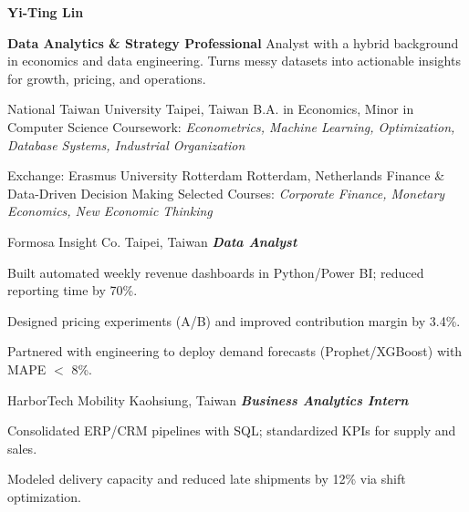 \documentclass[10pt]{article}
\begin{document}
\begin{center}
	\textbf{\LARGE Yi-Ting Lin}\\[0.5ex]
\end{center}
\spacedhrule{-1.0ex}{-0.5ex}
\spacedhrule{0.8ex}{0.0ex}

\begin{justify}
\textbf{Data Analytics \& Strategy Professional}
\small{Analyst with a hybrid background in economics and data engineering. Turns messy datasets into actionable insights for growth, pricing, and operations.}
\end{justify}

\spacedhrule{0.8ex}{0.0ex}

\headedsection
{National Taiwan University}
{Taipei, Taiwan}
{B.A. in Economics, Minor in Computer Science}
{}
{Coursework: \textit{Econometrics, Machine Learning, Optimization, Database Systems, Industrial Organization}}

\headedsection
{Exchange: Erasmus University Rotterdam}
{Rotterdam, Netherlands}
{Finance \& Data-Driven Decision Making}
{}
{Selected Courses: \textit{Corporate Finance, Monetary Economics, New Economic Thinking}}

\spacedhrule{0.8ex}{0.0ex}

\headedsection
{Formosa Insight Co.}
{Taipei, Taiwan}
{\textbf{\textsl{Data Analyst}}}
{}
{\vspace{-2.0ex}
\begin{circlist}
  \item Built automated weekly revenue dashboards in Python/Power BI; reduced reporting time by 70\%.
  \item Designed pricing experiments (A/B) and improved contribution margin by 3.4\%.
  \item Partnered with engineering to deploy demand forecasts (Prophet/XGBoost) with MAPE $<$ 8\%.
\end{circlist}
}

\headedsection
{HarborTech Mobility}
{Kaohsiung, Taiwan}
{\textbf{\textsl{Business Analytics Intern}}}
{}
{\vspace{-2.0ex}
\begin{circlist}
  \item Consolidated ERP/CRM pipelines with SQL; standardized KPIs for supply and sales.
  \item Modeled delivery capacity and reduced late shipments by 12\% via shift optimization.
\end{circlist}
}
\end{document}
